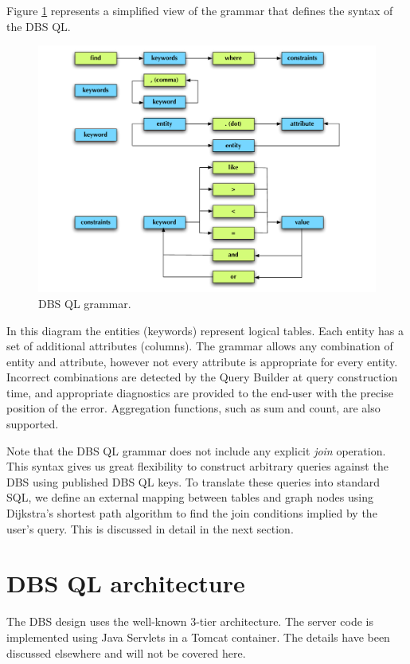 \documentclass[a4paper]{jpconf}
\begin{document}
Figure \ref{Grammar} represents a simplified view of the grammar
that defines the syntax of the DBS QL.
\begin{figure}[htb]
\centering
\includegraphics[width=150mm]{DBSSql_grammar.pdf}
\caption{
DBS QL grammar.
}
\label{Grammar}
\end{figure}
In this diagram the entities (keywords) represent logical tables. 
Each entity has a set of additional attributes (columns). 
The grammar allows any combination of entity and
attribute, however not every attribute
is appropriate for every entity.  Incorrect
combinations are detected by the Query Builder at query construction time,
and appropriate diagnostics are provided to the end-user with the
precise position of the error.  Aggregation functions, such
as sum and count, are also supported.

Note that the DBS QL grammar does not
include any explicit {\it join} operation.
This syntax gives us great flexibility to construct
arbitrary queries against the DBS using published DBS QL keys.
To translate these queries into standard SQL, we define an external mapping between
tables and graph nodes using
Dijkstra’s shortest path algorithm to find the join conditions
implied by the user's query.  This is discussed in detail in the next section.

\section{DBS QL architecture}

The DBS design uses the well-known 3-tier architecture. The server
code is implemented using Java Servlets in a Tomcat container.
The details have been discussed elsewhere\cite{DBS} and will not
be covered here. 
\end{document}
